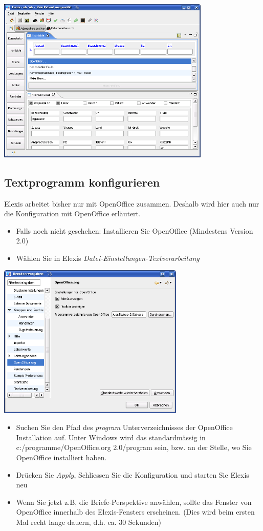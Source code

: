 \includegraphics[width=4in]{images/grundkonfmand1.png}
\subsection{Textprogramm konfigurieren}

Elexis arbeitet bisher nur mit OpenOffice zusammen. Deshalb wird hier auch nur die Konfiguration mit OpenOffice erläutert.

\begin{itemize}
 \item Falls noch nicht geschehen: Installieren Sie OpenOffice (Mindestens Version 2.0)
 \item Wählen Sie in Elexis \textit{Datei-Einstellungen-Textverarbeitung}
\end{itemize}

\includegraphics[width=3.5in]{images/grundkonfmand2.png}

\begin{itemize}
 \item Suchen Sie den Pfad des \textit{program} Unterverzeichnisses der OpenOffice Installation auf. Unter Windows wird das standardmässig in c:/programme/OpenOffice.org 2.0/program sein, bzw. an der Stelle, wo Sie OpenOffice installiert haben.
 \item Drücken Sie \textit{Apply}, Schliessen Sie die Konfiguration und starten Sie Elexis neu
 \item Wenn Sie jetzt z.B, die Briefe-Perspektive anwählen, sollte das Fenster von OpenOffice innerhalb des Elexis-Fensters erscheinen. (Dies wird beim ersten Mal recht lange dauern, d.h. ca. 30 Sekunden)
\end{itemize}

